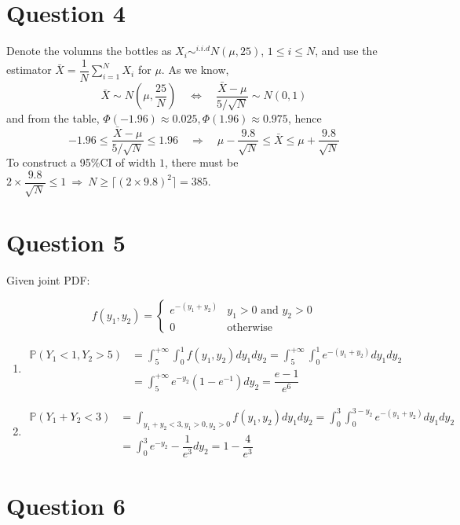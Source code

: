 \documentclass[12pt]{article}
\begin{document}
\section{Question 4}

Denote the volumns the bottles as $X_i\sim ^{i.i.d} N(\mu,25)$, $1\leq i\leq N$, and use the estimator $\displaystyle\bar{X}=\dfrac{1}{N}\sum_{i=1}^NX_i$ for $\mu$. As we know, 
$$\bar{X}\sim N(\mu,\dfrac{25}{N})\quad\Leftrightarrow\quad \dfrac{\bar{X}-\mu}{5/\sqrt{N}}\sim N(0,1)$$
and from the table, $\Phi(-1.96)\approx0.025,\Phi(1.96)\approx 0.975$, hence
$$-1.96\leqslant\dfrac{\bar{X}-\mu}{5/\sqrt{N}}\leqslant1.96\quad\Rightarrow\quad \mu-\dfrac{9.8}{\sqrt{N}}\leqslant \bar{X}\leqslant \mu+\dfrac{9.8}{\sqrt{N}}$$
To construct a 95\%CI of width $1$, there must be $2\times \dfrac{9.8}{\sqrt{N}}\leqslant 1\ \Rightarrow\ N\geqslant \lceil (2\times 9.8)^2\rceil=385$.

\section{Question 5}

Given joint PDF:

\begin{equation*}
    f(y_1,y_2)=\left\{\begin{array}{ll}
        e^{-(y_1+y_2)} & y_1>0\text{ and }y_2>0 \\
        0  & \text{otherwise}
    \end{array}\right.
\end{equation*}

\begin{enumerate}
    \item \begin{align*}\displaystyle\mathbb{P}(Y_1<1,Y_2>5)&=\int_5^{+\infty}\int_0^1f(y_1,y_2)dy_1dy_2=\int_5^{+\infty}\int_0^1e^{-(y_1+y_2)}dy_1dy_2\\
    &=\int_5^{+\infty}e^{-y_2}(1-e^{-1})dy_2=\dfrac{e-1}{e^6}
    \end{align*}
    \item \begin{align*}\displaystyle\mathbb{P}(Y_1+Y_2<3)&=\int_{y_1+y_2<3,y_1>0,y_2>0} f(y_1,y_2)dy_1dy_2=\int_0^3\int_0^{3-y_2} e^{-(y_1+y_2)}dy_1dy_2\\
        &=\int_0^3e^{-y_2}-\dfrac{1}{e^3}dy_2=1-\dfrac{4}{e^3}
        \end{align*}
\end{enumerate}

\section{Question 6}
\end{document}
